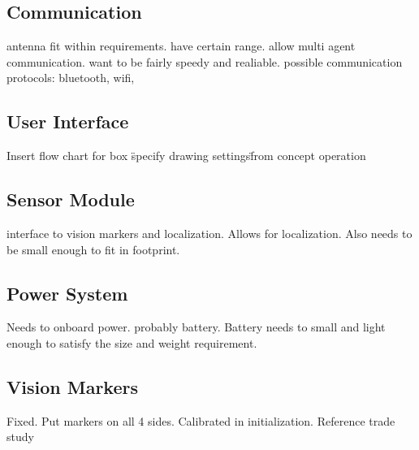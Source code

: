 \subsection{Communication}
\label{sec:subsystem_communication}
antenna fit within requirements. have certain range. allow multi agent communication. want to be fairly speedy and realiable. possible communication protocols: bluetooth, wifi,

\subsection{User Interface}
\label{sec:subsystem_ui}
Insert flow chart for box \"specify drawing settings\" from concept operation

\subsection{Sensor Module}
\label{sec:subsystem_sensors}
interface to vision markers and localization. Allows for localization. Also needs to be small enough to fit in footprint.

\subsection{Power System}
\label{sec:subsystem_power}
Needs to onboard power. probably battery. Battery needs to small and light enough to satisfy the size and weight requirement.

\subsection{Vision Markers}
\label{sec:subsystem_markers}
Fixed. Put markers on all 4 sides. Calibrated in initialization. Reference trade study
